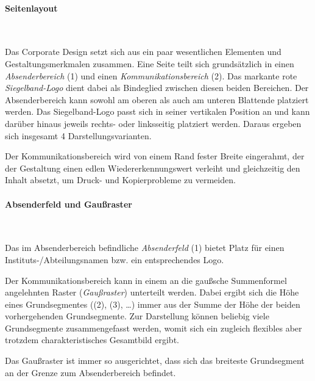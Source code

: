 \paragraph{Seitenlayout}\hfill\\
\begin{minipage}[t]{0.45\textwidth}
\vspace*{0pt}
\centering{}%
\end{minipage}
\begin{minipage}[t]{0.55\textwidth}
\vspace*{0pt}
Das Corporate Design setzt sich aus ein paar wesentlichen Elementen und
Gestaltungsmerkmalen zusammen.
Eine Seite teilt sich grundsätzlich in einen \emph{Absenderbereich} (1)
und einen \emph{Kommunikationsbereich} (2).
%
Das markante rote \emph{Siegelband-Logo} dient dabei als Bindeglied zwischen
diesen beiden Bereichen. 
%
Der Absenderbereich kann sowohl am oberen als auch am unteren Blattende
platziert werden.
Das Siegelband-Logo passt sich in seiner vertikalen Position an
und kann darüber hinaus jeweils rechts- oder linksseitig platziert werden.
Daraus ergeben sich insgesamt 4 Darstellungsvarianten.

Der Kommunikationsbereich wird von einem Rand fester Breite eingerahmt,
der der Gestaltung einen edlen Wiedererkennungswert verleiht und gleichzeitig
den Inhalt absetzt, um Druck- und Kopierprobleme zu vermeiden.
\end{minipage}\bigskip

\paragraph{Absenderfeld und Gaußraster}\hfill\\
\begin{minipage}[t]{0.45\textwidth}
\vspace*{0pt}
\centering{}%
\end{minipage}
\begin{minipage}[t]{0.55\textwidth}
\vspace*{0pt}
Das im Absenderbereich befindliche \emph{Absenderfeld} (1) bietet Platz für
einen \mbox{Instituts-/}Abteilungsnamen bzw. ein entsprechendes Logo.
%

Der Kommunikationsbereich kann in einem an die gaußsche Summenformel
angelehnten Raster (\emph{Gaußraster}) unterteilt werden.
%
Dabei ergibt sich die Höhe eines Grundsegmentes ((2), (3), \ldots)
immer aus der Summe der Höhe der beiden vorhergehenden Grundsegmente.
Zur Darstellung können beliebig viele Grundsegmente zusammengefasst werden,
womit sich ein zugleich flexibles aber trotzdem charakteristisches
Gesamtbild ergibt.

Das Gaußraster ist immer so ausgerichtet, dass sich das breiteste Grundsegment
an der Grenze zum Absenderbereich befindet.
\end{minipage}

